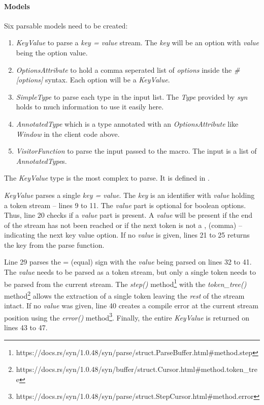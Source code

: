 \paragraph{Models}
Six parsable models need to be created:
\begin{enumerate}
	\item \textit{KeyValue} to parse a \textit{key = value} stream.
	      The \textit{key} will be an option with \textit{value} being the option value.
	\item \textit{OptionsAttribute} to hold a comma seperated list of \textit{options} inside the \textit{\#[options]} syntax.
	      Each option will be a \textit{KeyValue}.
	\item \textit{SimpleType} to parse each type in the input list.
	      The \textit{Type} provided by \textit{syn} holds to much information to use it easily here.
	\item \textit{AnnotatedType} which is a type annotated with an \textit{OptionsAttribute} like \textit{Window} in the client code above.
	\item \textit{VisitorFunction} to parse the input passed to the macro.
	      The input is a list of \textit{AnnotatedType}s.
\end{enumerate}

The \textit{KeyValue} type is the most complex to parse.
It is defined in .


\textit{KeyValue} parses a single \textit{key = value}.
The \textit{key} is an identifier with \textit{value} holding a token stream -- lines 9 to 11.
The \textit{value} part is optional for boolean options.
Thus, line 20 checks if a \textit{value} part is present.
A \textit{value} will be present if the end of the stream has not been reached or if the next token is not a , (comma) -- indicating the next key value option.
If no \textit{value} is given, lines 21 to 25 returns the key from the parse function.

Line 29 parses the = (equal) sign with the \textit{value} being parsed on lines 32 to 41.
The \textit{value} needs to be parsed as a token stream, but only a single token needs to be parsed from the current stream.
The \textit{step()} method\footnote{https://docs.rs/syn/1.0.48/syn/parse/struct.ParseBuffer.html\#method.step} with the \textit{token\_tree()} method\footnote{https://docs.rs/syn/1.0.48/syn/buffer/struct.Cursor.html\#method.token\_tree} allows the extraction of a single token leaving the \textit{rest} of the stream intact.
If no \textit{value} was given, line 40 creates a compile error at the current stream position using the \textit{error()} method\footnote{https://docs.rs/syn/1.0.48/syn/parse/struct.StepCursor.html\#method.error}.
Finally, the entire \textit{KeyValue} is returned on lines 43 to 47.

